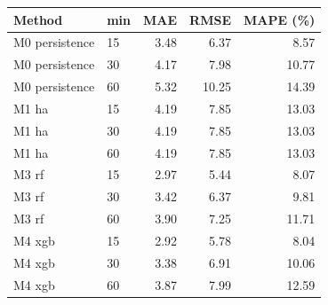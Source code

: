 \begin{tabular}{llrrr}
\hline
Method & min & MAE & RMSE & MAPE (\%) \\
\hline
M0 persistence & 15 & 3.48 & 6.37 & 8.57 \\
M0 persistence & 30 & 4.17 & 7.98 & 10.77 \\
M0 persistence & 60 & 5.32 & 10.25 & 14.39 \\
M1 ha & 15 & 4.19 & 7.85 & 13.03 \\
M1 ha & 30 & 4.19 & 7.85 & 13.03 \\
M1 ha & 60 & 4.19 & 7.85 & 13.03 \\
M3 rf & 15 & 2.97 & 5.44 & 8.07 \\
M3 rf & 30 & 3.42 & 6.37 & 9.81 \\
M3 rf & 60 & 3.90 & 7.25 & 11.71 \\
M4 xgb & 15 & 2.92 & 5.78 & 8.04 \\
M4 xgb & 30 & 3.38 & 6.91 & 10.06 \\
M4 xgb & 60 & 3.87 & 7.99 & 12.59 \\
\hline
\end{tabular}
